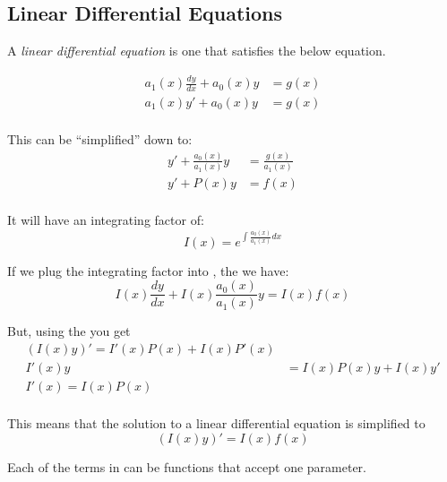\subsection{Linear Differential Equations} \label{subsec:Linear ODEs}
\begin{definition} \label{def:Linear ODE}
  A \emph{linear differential equation} is one that satisfies the below equation.

  \begin{equation} \label{eq:Linear ODE Equation}
    \begin{aligned}
      a_{1}(x) \frac{dy}{dx} + a_{0}(x)y &= g(x) \\
      a_{1}(x) y' + a_{0}(x)y &= g(x) \\
    \end{aligned}
  \end{equation}

  This can be ``simplified'' down to:
  \begin{equation*}
    \begin{aligned}
      y' + \frac{a_{0}(x)}{a_{1}(x)} y &= \frac{g(x)}{a_{1}(x)} \\
      y' + P(x) y &= f(x) \\
    \end{aligned}
  \end{equation*}

  It will have an integrating factor of:
  \begin{equation} \label{eq:Linear ODE Integrating Factor}
    I(x) = e^{\int \frac{a_{0}(x)}{a_{1}(x)} dx}
  \end{equation}

  If we plug the integrating factor into , the we have:
    \begin{equation*}
    I(x) \frac{dy}{dx} + I(x) \frac{a_{0}(x)}{a_{1}(x)} y = I(x) f(x)
  \end{equation*}

  But, using the  you get
  \begin{equation*}
    \begin{aligned}
      \left( I(x) y \right)' = I'(x)P(x) + I(x)P'(x) \\
      I'(x) y &= I(x) P(x) y + I(x) y' \\
      I'(x) = I(x) P(x) \\
    \end{aligned}
  \end{equation*}

  This means that the solution to a linear differential equation is simplified to
  \begin{equation} \label{eq:Linear ODE Solution}
    \left( I(x) y \right)' = I(x) f(x)
  \end{equation}

  \begin{remark}
    Each of the terms in  can be functions that accept one parameter.
  \end{remark}
\end{definition}

